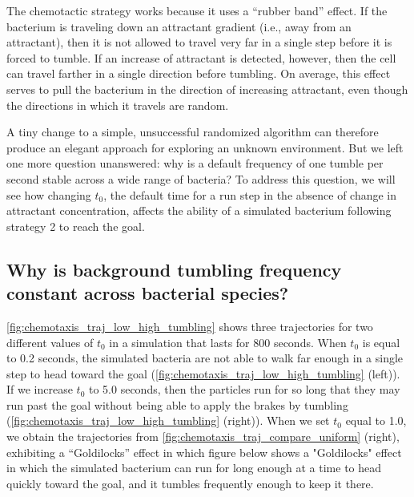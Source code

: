 The chemotactic strategy works because it uses a ``rubber band'' effect. If the bacterium is traveling down an attractant gradient (i.e., away from an attractant), then it is not allowed to travel very far in a single step before it is forced to tumble. If an increase of attractant is detected, however, then the cell can travel farther in a single direction before tumbling. On average, this effect serves to pull the bacterium in the direction of increasing attractant, even though the directions in which it travels are random.

A tiny change to a simple, unsuccessful randomized algorithm can therefore produce an elegant approach for exploring an unknown environment. But we left one more question unanswered: why is a default frequency of one tumble per second stable across a wide range of bacteria? To address this question, we will see how changing $t_0$, the default time for a run step in the absence of change in attractant concentration, affects the ability of a simulated bacterium following strategy 2 to reach the goal.

\FloatBarrier
{}
\subsection{Why is background tumbling frequency constant across bacterial species?}

\autoref{fig:chemotaxis_traj_low_high_tumbling} shows three trajectories for two different values of $t_0$ in a simulation that lasts for 800 seconds. When $t_0$ is equal to 0.2 seconds, the simulated bacteria are not able to walk far enough in a single step to head toward the goal (\autoref{fig:chemotaxis_traj_low_high_tumbling} (left)). If we increase $t_0$ to 5.0 seconds, then the particles run for so long that they may run past the goal without being able to apply the brakes by tumbling (\autoref{fig:chemotaxis_traj_low_high_tumbling} (right)). When we set $t_0$ equal to 1.0, we obtain the trajectories from \autoref{fig:chemotaxis_traj_compare_uniform} (right), exhibiting a ``Goldilocks'' effect in which figure below shows a "Goldilocks" effect in which the simulated bacterium can run for long enough at a time to head quickly toward the goal, and it tumbles frequently enough to keep it there.\\

